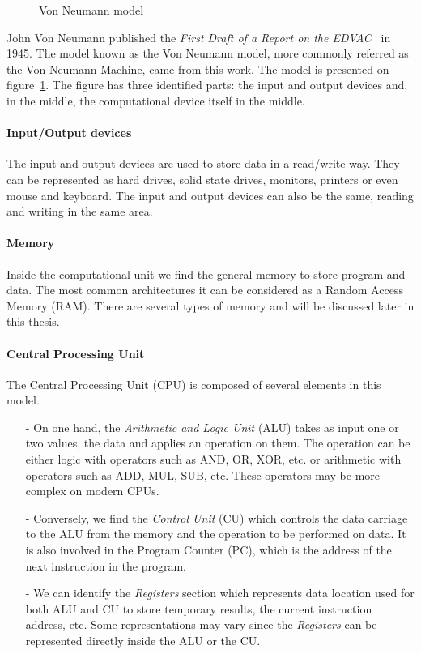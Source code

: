 \begin{figure}
\centering 

\caption{Von Neumann model}
\label{fig:1_HPC:von_neumann_model}
\end{figure}

John Von Neumann published the \textit{First Draft of a Report on the EDVAC}~\cite{von1993first} in 1945. 
The model known as the Von Neumann model, more commonly referred as the Von Neumann Machine, came from this work.
The model is presented on figure~\ref{fig:1_HPC:von_neumann_model}.
The figure has three identified parts: the input and output devices and, in the middle, the computational device itself in the middle. 
\paragraph{Input/Output devices}
The input and output devices are used to store data in a read/write way. 
They can be represented as hard drives, solid state drives, monitors, printers or even mouse and keyboard.
The input and output devices can also be the same, reading and writing in the same area.\\

\paragraph{Memory} 
Inside the computational unit we find the general memory to store program and data. 
The most common architectures it can be considered as a Random Access Memory (RAM). 
There are several types of memory and will be discussed later in this thesis. 

\paragraph{Central Processing Unit}
The Central Processing Unit (CPU) is composed of several elements in this model. 
\begin{itemize}[noitemsep,nolistsep]
\item[-] On one hand, the \textit{Arithmetic and Logic Unit} (ALU) takes as input one or two values, the data and applies an operation on them. 
The operation can be either logic with operators such as AND, OR, XOR, etc. or arithmetic with operators such as ADD, MUL, SUB, etc. 
These operators may be more complex on modern CPUs. 
\item[-] Conversely, we find the \textit{Control Unit} (CU) which controls the data carriage to the ALU from the memory and the operation to be performed on data.
It is also involved in the Program Counter (PC), which is the address of the next instruction in the program. 
\item[-] We can identify the \textit{Registers} section which represents data location used for both ALU and CU to store temporary results, the current instruction address, etc. 
Some representations may vary since the \textit{Registers} can be represented directly inside the ALU or the CU. 
\end{itemize}

